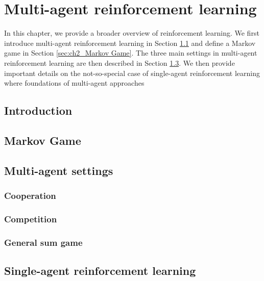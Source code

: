 \chapter{Multi-agent reinforcement learning} \label{ch:marl}

\begin{chapter_outline}

In this chapter, we provide a broader overview of reinforcement learning.
We first introduce multi-agent reinforcement learning in Section \ref{sec:ch2_Introduction} and define a Markov game in Section \ref{sec:ch2_Markov Game}.
The three main settings in multi-agent reinforcement learning are then described in Section \ref{sec:ch2_multi_agent_settings}.
We then provide important details on the not-so-special case of single-agent reinforcement learning where foundations of multi-agent approaches

\end{chapter_outline}


\section{Introduction} 
\label{sec:ch2_Introduction}

\section{Markov Game} 
\label{sec:ch2_Markov_Game}

\section{Multi-agent settings} 
\label{sec:ch2_multi_agent_settings}

\subsection{Cooperation} 
\label{sec:ch2_Cooperation}

\subsection{Competition} 
\label{sec:ch2_Competition}

\subsection{General sum game} 
\label{sec:ch2_general_sum_game}

\section{Single-agent reinforcement learning} 
\label{sec:ch2_single_agent_RL}
